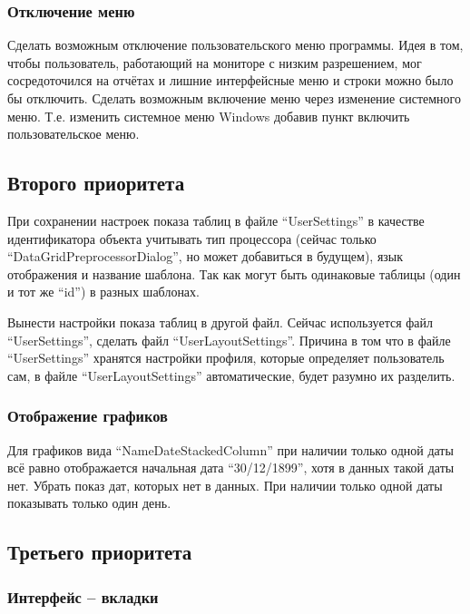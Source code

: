 \subsubsection{Отключение меню}

Сделать возможным отключение пользовательского меню программы. Идея в том, чтобы пользователь,
работающий на мониторе с низким разрешением, мог сосредоточился на отчётах и лишние интерфейсные
меню и строки можно было бы отключить. Сделать возможным включение меню через изменение системного
меню. Т.е. изменить системное меню Windows добавив пункт включить пользовательское меню.

\subsection{Второго приоритета}

При сохранении настроек показа таблиц в файле ``UserSettings'' в качестве идентификатора объекта
учитывать тип процессора (сейчас только ``DataGridPreprocessorDialog'', но может добавиться в
будущем), язык отображения и название шаблона. Так как могут быть одинаковые таблицы (один и тот же
``id'') в разных шаблонах.

Вынести настройки показа таблиц в другой файл. Сейчас используется файл ``UserSettings'', сделать
файл ``UserLayoutSettings''. Причина в том что в файле ``UserSettings'' хранятся настройки профиля,
которые определяет пользователь сам, в файле ``UserLayoutSettings'' автоматические, будет разумно их
разделить.

\subsubsection{Отображение графиков}

Для графиков вида ``NameDateStackedColumn'' при наличии только одной даты всё равно отображается
начальная дата ``30/12/1899'', хотя в данных такой даты нет. Убрать показ дат, которых нет в данных.
При наличии только одной даты показывать только один день.

\subsection{Третьего приоритета}

\subsubsection{Интерфейс -- вкладки}

